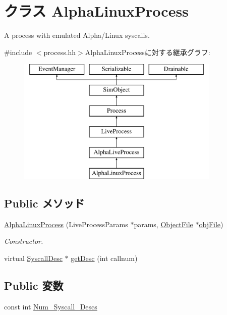 \hypertarget{classAlphaISA_1_1AlphaLinuxProcess}{
\section{クラス AlphaLinuxProcess}
\label{classAlphaISA_1_1AlphaLinuxProcess}
}


A process with emulated Alpha/Linux syscalls.  


{\ttfamily \#include $<$process.hh$>$}AlphaLinuxProcessに対する継承グラフ:\begin{figure}[H]
\begin{center}
\leavevmode
\includegraphics[height=6cm]{classAlphaISA_1_1AlphaLinuxProcess}
\end{center}
\end{figure}
\subsection*{Public メソッド}
\begin{DoxyCompactItemize}
\item 
\hyperlink{classAlphaISA_1_1AlphaLinuxProcess_aa748382496fdd00b4d1cff0ef1afa8bc}{AlphaLinuxProcess} (LiveProcessParams $\ast$params, \hyperlink{classObjectFile}{ObjectFile} $\ast$\hyperlink{classLiveProcess_ab6cfcfa7903c66267b3e0351c3caa809}{objFile})
\begin{DoxyCompactList}\small\item\em Constructor. \item\end{DoxyCompactList}\item 
virtual \hyperlink{classSyscallDesc}{SyscallDesc} $\ast$ \hyperlink{classAlphaISA_1_1AlphaLinuxProcess_aebbff609a7235342925445690acf5ee8}{getDesc} (int callnum)
\end{DoxyCompactItemize}
\subsection*{Public 変数}
\begin{DoxyCompactItemize}
\item 
const int \hyperlink{classAlphaISA_1_1AlphaLinuxProcess_a9534988905c6f5c8c57c4b6a7b179fea}{Num\_\-Syscall\_\-Descs}
\end{DoxyCompactItemize}
